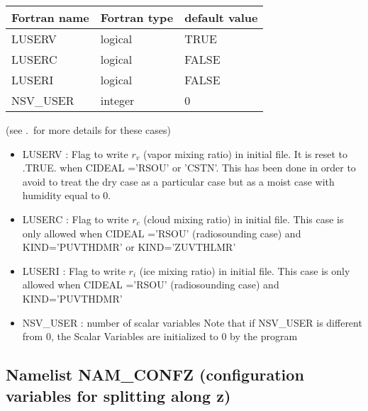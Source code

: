 \begin{center}
\begin{tabular} {|l|l|l|}
\hline
Fortran name & Fortran type & default value \\
\hline
LUSERV    & logical & TRUE  \\
LUSERC    & logical & FALSE  \\
LUSERI    & logical & FALSE  \\
NSV\_USER  & integer & 0   \\  
\hline
\end{tabular}
\end{center}

(see \thechapter.\thesection \ for more details for these cases)
\begin{itemize}

\item  LUSERV   : Flag to write
$r_{v}$ (vapor mixing ratio) in initial file. It is reset to .TRUE.
when CIDEAL ='RSOU' or 'CSTN'. This has been done in order to avoid
to treat the dry case as a particular case but as a moist case with
humidity equal to 0.

\item  LUSERC   : Flag to write
$r_{c}$ (cloud mixing ratio) in initial file. This case is only
allowed when CIDEAL ='RSOU' (radiosounding case) and KIND='PUVTHDMR'
or KIND='ZUVTHLMR'

\item  LUSERI   : Flag to write
$r_{i}$ (ice mixing ratio) in initial file. This case is only
allowed when CIDEAL ='RSOU' (radiosounding case) and KIND='PUVTHDMR'

\item NSV\_USER : number of
scalar variables Note that if NSV\_USER is different from 0, the
Scalar Variables are initialized to 0  by the program

\end{itemize}

\subsection{Namelist NAM\_CONFZ (configuration variables for
splitting along z)\label{s:namconfz}}

